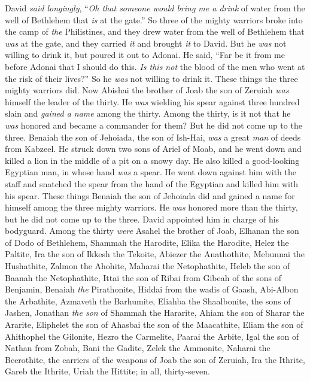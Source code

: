 \begin{biblechapter}
\verse David \textit{said longingly}, “\textit{Oh that someone would bring me a drink} of water from the well of Bethlehem that \textit{is} at the gate.”
\verse So three of the mighty warriors broke into the camp of \textit{the} Philistines, and they drew water from the well of Bethlehem that \textit{was} at the gate, and they carried \textit{it} and brought \textit{it} to David. But he \textit{was} not willing to drink it, but poured it out to Adonai.
\verse He said, “Far be it from me before Adonai that I should do this. \textit{Is this not} the blood of the men who went at the risk of their lives?” So he \textit{was} not willing to drink it. These things the three mighty warriors did.
\verse Now Abishai the brother of Joab the son of Zeruiah \textit{was} himself the leader of the thirty. He \textit{was} wielding his spear against three hundred slain and \textit{gained a name} among the thirty.
\verse Among the thirty, is it not that he \textit{was} honored and became a commander for them? But he did not come up to the three.
\verse Benaiah the son of Jehoiada, the son of Ish-Hai, \textit{was} a great \textit{man} of deeds from Kabzeel. He struck down two sons of Ariel of Moab, and he went down and killed a lion in the middle of a pit on a snowy day.
\verse He also killed a good-looking Egyptian man, in whose hand \textit{was} a spear. He went down against him with the staff and snatched the spear from the hand of the Egyptian and killed him with his spear.
\verse These things Benaiah the son of Jehoiada did and gained a name for himself among the three mighty warriors.
\verse He \textit{was} honored more than the thirty, but he did not come up to the three. David appointed him in charge of his bodyguard.
 Among the thirty \textit{were} Asahel the brother of Joab, Elhanan the son of Dodo of Bethlehem,
\verse Shammah the Harodite, Elika the Harodite,
\verse Helez the Paltite, Ira the son of Ikkesh the Tekoite,
\verse Abiezer the Anathothite, Mebunnai the Hushathite,
\verse Zalmon the Ahohite, Maharai the Netophathite,
\verse Heleb the son of Baanah the Netophathite, Ittai the son of Ribai from Gibeah of the sons of Benjamin,
\verse Benaiah \textit{the} Pirathonite, Hiddai from the wadis of Gaash,
\verse Abi-Albon the Arbathite, Azmaveth the Barhumite,
\verse Eliahba the Shaalbonite, the sons of Jashen, Jonathan
\verse \textit{the son} of Shammah the Hararite, Ahiam the son of Sharar the Ararite,
\verse Eliphelet the son of Ahasbai the son of the Maacathite, Eliam the son of Ahithophel the Gilonite,
\verse Hezro the Carmelite, Paarai the Arbite,
\verse Igal the son of Nathan from Zobah, Bani the Gadite,
\verse Zelek the Ammonite, Naharai the Beerothite, the carriers of the weapons of Joab the son of Zeruiah,
\verse Ira the Ithrite, Gareb the Ithrite,
\verse Uriah the Hittite; in all, thirty-seven.
\end{biblechapter}


